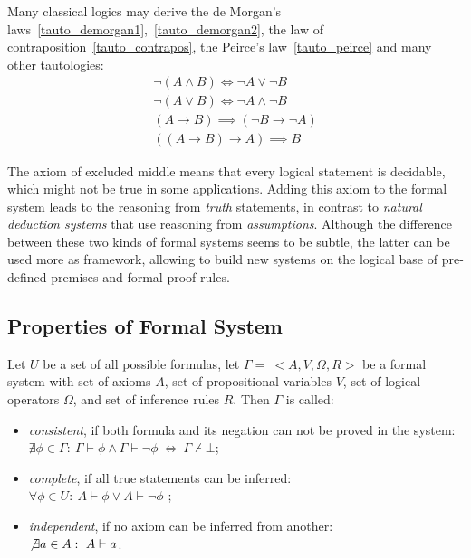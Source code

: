 \documentclass[article]{aaltoseries}
\begin{document}
Many classical logics may derive the de Morgan's laws~\eqref{tauto_demorgan1},~\eqref{tauto_demorgan2}, the law of contraposition~\eqref{tauto_contrapos}, the Peirce's law~\eqref{tauto_peirce} and many other tautologies:
\begin{gather}
\neg (A \land B) \Longleftrightarrow \neg A \lor \neg B 
    \label{tauto_demorgan1}\tag{DM1} \\
\neg (A \lor B) \Longleftrightarrow \neg A \land \neg B 
    \label{tauto_demorgan2}\tag{DM2} \\
(A \rightarrow B) \implies (\neg B \rightarrow \neg A) 
    \label{tauto_contrapos}\tag{CP} \\
((A \rightarrow B) \rightarrow A) \implies B
    \label{tauto_peirce}\tag{PL}
\end{gather}

The axiom of excluded middle means that every logical statement is decidable, which might not be true in some applications. Adding this axiom to the formal system leads to the reasoning from \textit{truth} statements, in contrast to \textit{natural deduction systems} that use reasoning from \textit{assumptions}. Although the difference between these two kinds of formal systems seems to be subtle, the latter can be used more as framework, allowing to build new systems on the logical base of pre-defined premises and formal proof rules. %

\subsection{Properties of Formal System}
\label{sec:properties}

Let $U$ be a set of all possible formulas, let $\Gamma = \ <A, V, \Omega, R>$ be a formal system with set of axioms $A$, set of propositional variables $V$, set of logical operators $\Omega$, and set of inference rules $R$. Then $\Gamma$ is called:
\begin{itemize}
	\itemsep0em
	\item \textit{consistent}, if both formula and its negation can not be proved in the system: \\
		$\nexists \phi \in \Gamma: \ \Gamma \vdash \phi \land \Gamma \vdash \neg \phi  \ \Leftrightarrow \ \Gamma \nvdash \bot$;
	\item \textit{complete}, if all true statements can be inferred: \\
		$\forall \phi \in U: \ A \vdash \phi \lor A \vdash \neg \phi$ ;
	\item \textit{independent}, if no axiom can be inferred from another: \\
		$\not \exists a \in A: \ A \vdash a$.
\end{itemize}
\end{document}
